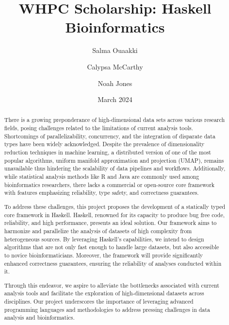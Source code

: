 \documentclass[11pt,letterpaper]{article}
\title{WHPC Scholarship: Haskell Bioinformatics}
\author[1]{Salma Ouaakki}
\author[2]{Calypsa McCarthy}
\author[3]{Noah Jones}
\affil[1]{(Applicant) University of Florida, Herbert Wertheim College of Engineering}
\affil[2]{(Applicant) University of Florida, Institute of Food and Agricultural Sciences}
\affil[3]{(Mentor) University of Florida, College of Medicine}
\date{March 2024}
\begin{document}
\linenumbers
\maketitle

\begin{abstract}
  There is a growing preponderance of high-dimensional data sets
  across various research fields, posing challenges related to the
  limitations of current analysis tools. Shortcomings of
  parallelizability, concurrency, and the integration of disparate
  data types have been widely acknowledged. Despite the
  prevalence of dimensionality reduction techniques in machine
  learning, a distributed version of one of the most popular
  algorithms, uniform manifold approximation and projection (UMAP),
  remains unavailable thus hindering the scalability of data
  pipelines and workflows. Additionally, while statistical analysis
  methods like R and Java are commonly used among bioinformatics
  researchers, there lacks a commercial or open-source core
  framework with features emphasizing reliability, type safety, and
  correctness guarantees.

  To address these challenges, this project proposes the development
  of a statically typed core framework in Haskell. Haskell, renowned
  for its capacity to produce bug free code, reliability, and high
  performance, presents an ideal solution. Our framework aims to
  harmonize and parallelize the analysis of datasets of high
  complexity from heterogeneous sources. By leveraging Haskell’s
  capabilities, we intend to design algorithms that are not only fast
  enough to handle large datasets, but also accessible to novice
  bioinformaticians. Moreover, the framework will provide
  significantly enhanced correctness guarantees, ensuring the
  reliability of analyses conducted within it.

   Through this endeavor, we aspire to alleviate the bottlenecks
  associated with current analysis tools and facilitate the
  exploration of high-dimensional datasets across disciplines. Our
  project underscores the importance of leveraging advanced
  programming languages and methodologies to address pressing
  challenges in data analysis and bioinformatics.


\end{abstract}
\end{document}
